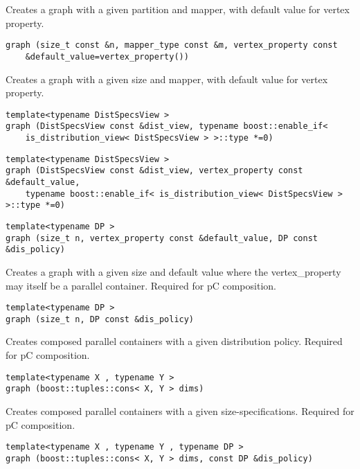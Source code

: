 Creates a graph with a given partition and mapper, with default value for vertex property.
 
\begin{verbatim}
graph (size_t const &n, mapper_type const &m, vertex_property const 
    &default_value=vertex_property())
\end{verbatim}

Creates a graph with a given size and mapper, with default value for vertex property. 
 
\begin{verbatim}
template<typename DistSpecsView >
graph (DistSpecsView const &dist_view, typename boost::enable_if< 
    is_distribution_view< DistSpecsView > >::type *=0)
\end{verbatim}
 
\begin{verbatim}
template<typename DistSpecsView >
graph (DistSpecsView const &dist_view, vertex_property const &default_value, 
    typename boost::enable_if< is_distribution_view< DistSpecsView > >::type *=0)
\end{verbatim}

 
\begin{verbatim}
template<typename DP >
graph (size_t n, vertex_property const &default_value, DP const &dis_policy)
\end{verbatim}

Creates a graph with a given size and default value where the vertex\_property may itself be a parallel container. Required for pC composition. 
 
\begin{verbatim}
template<typename DP >
graph (size_t n, DP const &dis_policy)
\end{verbatim}

Creates composed parallel containers with a given distribution policy. Required for pC composition. 
 
\begin{verbatim}
template<typename X , typename Y >
graph (boost::tuples::cons< X, Y > dims)
\end{verbatim}

Creates composed parallel containers with a given size-specifications. Required for pC composition. 
 
\begin{verbatim}
template<typename X , typename Y , typename DP >
graph (boost::tuples::cons< X, Y > dims, const DP &dis_policy)
\end{verbatim}

